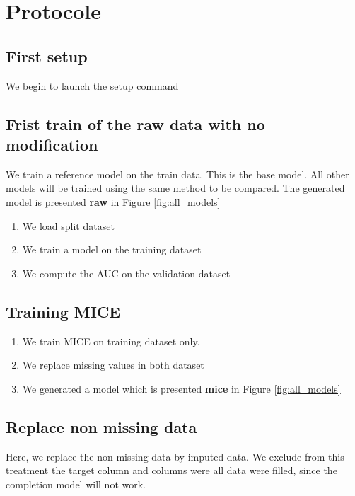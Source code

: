 \documentclass{article}
\begin{document}
    \section{Protocole}
        \subsection{First setup}
            We begin to launch the setup command

        \subsection{Frist train of the raw data with no modification}
            We train a reference model on the train data.
            This is the base model. All other models will be trained using the same method to be compared.
            The generated model is presented \textbf{raw} in Figure \ref{fig:all_models}

            \begin{enumerate}
                \item We load split dataset
                \item We train a model on the training dataset
                \item We compute the AUC on the validation dataset
            \end{enumerate}

        \subsection{Training MICE}
            \begin{enumerate}
                \item We train MICE on training dataset only.
                \item We replace missing values in both dataset
                \item We generated a model which is presented \textbf{mice} in Figure \ref{fig:all_models}
            \end{enumerate}


        \subsection{Replace non missing data}

            Here, we replace the non missing data by imputed data. We exclude from this treatment the target column and columns were all data were filled, since the completion model will not work. 
\end{document}
